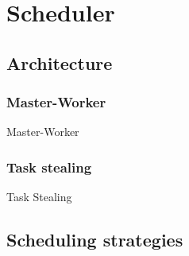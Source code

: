 \section{Scheduler}
\subsection{Architecture}

\subsubsection{Master-Worker}
	\begin{frame}{Master-Worker}
		
	\end{frame}
\subsubsection{Task stealing}
	\begin{frame}{Task Stealing}
	\end{frame}
\subsection{Scheduling strategies}

